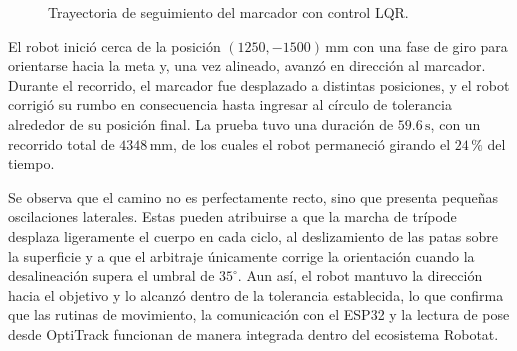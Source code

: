 \begin{figure}[H]
\centering\captionsetup{width=0.8\linewidth}
\caption{Trayectoria de seguimiento del marcador con control LQR.}

\label{fig:trayectoria_seguimiento}
\end{figure}

El robot inició cerca de la posición $(1250, -1500)\,\text{mm}$ con una fase de giro para orientarse hacia la meta y, una vez alineado, avanzó en dirección al marcador. Durante el recorrido, el marcador fue desplazado a distintas posiciones, y el robot corrigió su rumbo en consecuencia hasta ingresar al círculo de tolerancia alrededor de su posición final. La prueba tuvo una duración de $59.6\,\text{s}$, con un recorrido total de $4348\,\text{mm}$, de los cuales el robot permaneció girando el $24\,\%$ del tiempo.

Se observa que el camino no es perfectamente recto, sino que presenta pequeñas oscilaciones laterales. Estas pueden atribuirse a que la marcha de trípode desplaza ligeramente el cuerpo en cada ciclo, al deslizamiento de las patas sobre la superficie y a que el arbitraje únicamente corrige la orientación cuando la desalineación supera el umbral de $35^\circ$. Aun así, el robot mantuvo la dirección hacia el objetivo y lo alcanzó dentro de la tolerancia establecida, lo que confirma que las rutinas de movimiento, la comunicación con el ESP32 y la lectura de pose desde OptiTrack funcionan de manera integrada dentro del ecosistema Robotat.
